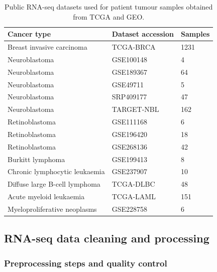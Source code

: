 \begin{table}[H]
\centering
\caption{Public RNA-seq datasets used for patient tumour samples obtained from TCGA and GEO.}
\label{tab:patient_datasets}
\begin{tabular}{lll}
\toprule
Cancer type & Dataset accession & Samples \\
\midrule

Breast invasive carcinoma & TCGA-BRCA & 1231 \\

Neuroblastoma & GSE100148 & 4 \\
Neuroblastoma & GSE189367 & 64 \\
Neuroblastoma & GSE49711 & 5 \\
Neuroblastoma & SRP409177 & 47 \\
Neuroblastoma & TARGET-NBL & 162 \\

Retinoblastoma & GSE111168 & 6 \\
Retinoblastoma & GSE196420 & 18 \\
Retinoblastoma & GSE268136 & 42 \\

Burkitt lymphoma & GSE199413 & 8 \\
Chronic lymphocytic leukaemia & GSE237907 & 10 \\
Diffuse large B-cell lymphoma & TCGA-DLBC & 48 \\
Acute myeloid leukaemia & TCGA-LAML & 151 \\
Myeloproliferative neoplasms & GSE228758 & 6 \\

\bottomrule
\end{tabular}
\end{table}

\subsection{RNA-seq data cleaning and processing}

\subsubsection{Preprocessing steps and quality control}

